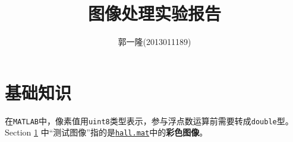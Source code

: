 \documentclass{article}
\author{郭一隆(2013011189)}
\title{图像处理实验报告}
\numberwithin{figure}{section}
\numberwithin{table}{section}
\numberwithin{listing}{section}
\numberwithin{equation}{section}
\begin{document}
    \maketitle

    \tableofcontents
    \newpage

    \listoffigures
    \listoftables
    \renewcommand\listoflistingscaption{List of Source Codes}
    \listoflistings
    \newpage

    \section{基础知识} %
    \label{sec:基础知识}

        在\texttt{MATLAB}中，像素值用\texttt{uint8}类型表示，参与浮点数运算前需要转成\texttt{double}型。Section \ref{sec:基础知识} 中“测试图像”指的是\href{run:../resource/hall.mat}{\texttt{hall.mat}}中的\textbf{彩色图像}。
\end{document}
